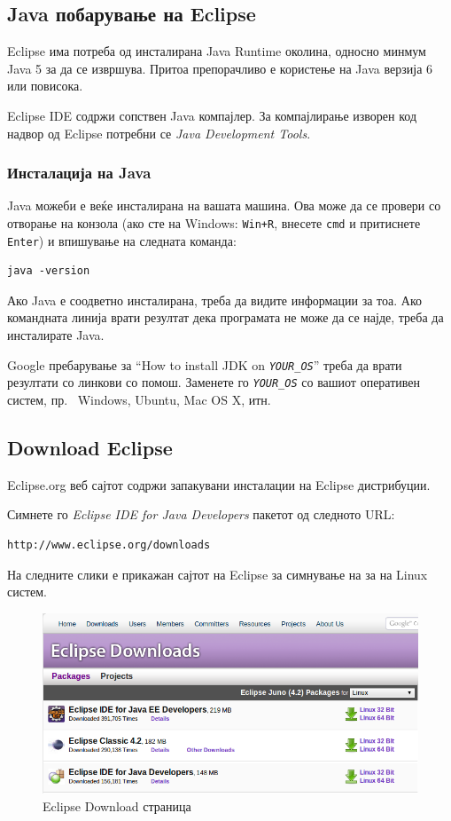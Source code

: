 \subsection{Java побарување на Eclipse}

Eclipse има потреба од инсталирана Java Runtime околина, односно минмум Java
5 за да се извршува. Притоа препорачливо е користење на Java верзија 6 или
повисока.

Eclipse IDE содржи сопствен Java компајлер. За компајлирање изворен
код надвор од Eclipse потребни се  \emph{Java Development Tools}.

\subsubsection{Инсталација на Java}

Java можеби е веќе инсталирана на вашата машина. Ова може да се провери со
отворање на конзола (ако сте на Windows: \texttt{Win+R}, внесете \texttt{cmd} и
притиснете \texttt{Enter}) и впишување на следната команда:

\begin{verbatim}
java -version 
\end{verbatim}

Ако Java е соодветно инсталирана, треба да видите информации за тоа. Ако
командната линија врати резултат дека програмата не може да се најде, треба да
инсталирате Java.

Google пребарување за ``How to install JDK on \emph{\texttt{YOUR\_OS}}'' треба
да врати резултати со линкови со помош. Заменете го \emph{\texttt{YOUR\_OS}} со
вашиот оперативен систем, пр. ~Windows, Ubuntu, Mac OS X, итн.

\subsection{Download Eclipse}

Eclipse.org веб сајтот содржи запакувани инсталации на Eclipse дистрибуции.

Симнете го \emph{Eclipse IDE for Java Developers} пакетот од следното URL:

\begin{verbatim}
http://www.eclipse.org/downloads 
\end{verbatim}

На следните слики е прикажан сајтот на Eclipse за симнување на за на Linux
систем.

\begin{figure}[htbp]
\centering
\includegraphics[scale=0.5]{images/download}
\caption{Eclipse Download страница}
\end{figure}

